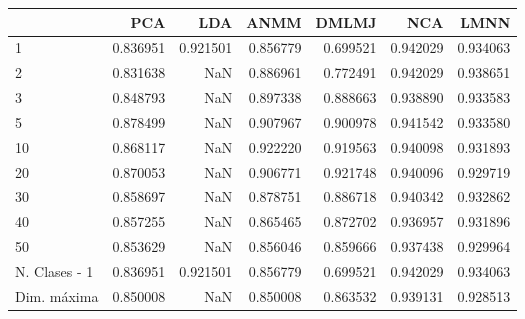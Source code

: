 \begin{tabular}{lrrrrrr}
\toprule
{} &       PCA &       LDA &      ANMM &     DMLMJ &       NCA &           LMNN \\
\midrule
1             &  0.836951 &  0.921501 &  0.856779 &  0.699521 &  0.942029 &       0.934063 \\
2             &  0.831638 &       NaN &  0.886961 &  0.772491 &  0.942029 &       0.938651 \\
3             &  0.848793 &       NaN &  0.897338 &  0.888663 &  0.938890 &       0.933583 \\
5             &  0.878499 &       NaN &  0.907967 &  0.900978 &  0.941542 &       0.933580 \\
10            &  0.868117 &       NaN &  0.922220 &  0.919563 &  0.940098 &       0.931893 \\
20            &  0.870053 &       NaN &  0.906771 &  0.921748 &  0.940096 &       0.929719 \\
30            &  0.858697 &       NaN &  0.878751 &  0.886718 &  0.940342 &       0.932862 \\
40            &  0.857255 &       NaN &  0.865465 &  0.872702 &  0.936957 &       0.931896 \\
50            &  0.853629 &       NaN &  0.856046 &  0.859666 &  0.937438 &       0.929964 \\
N. Clases - 1 &  0.836951 &  0.921501 &  0.856779 &  0.699521 &  0.942029 &       0.934063 \\
Dim. máxima   &  0.850008 &       NaN &  0.850008 &  0.863532 &  0.939131 &       0.928513 \\
\bottomrule
\end{tabular}
